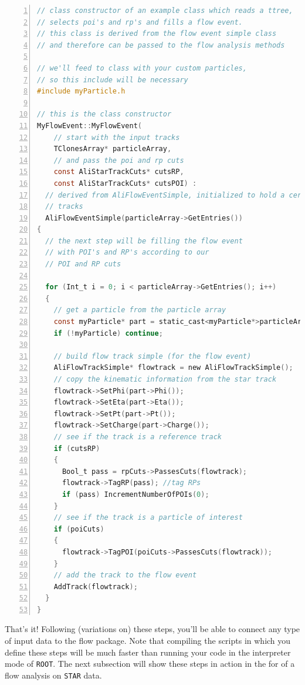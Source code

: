 \documentclass[a4paper]{book}
\numberwithin{equation}{subsection}
\begin{document}
\begin{lstlisting}[language=C, numbers=left]
// class constructor of an example class which reads a ttree, 
// selects poi's and rp's and fills a flow event. 
// this class is derived from the flow event simple class
// and therefore can be passed to the flow analysis methods

// we'll feed to class with your custom particles, 
// so this include will be necessary
#include myParticle.h

// this is the class constructor
MyFlowEvent::MyFlowEvent(
    // start with the input tracks
    TClonesArray* particleArray,
    // and pass the poi and rp cuts
    const AliStarTrackCuts* cutsRP,
    const AliStarTrackCuts* cutsPOI) :
  // derived from AliFlowEventSimple, initialized to hold a certain number of 
  // tracks
  AliFlowEventSimple(particleArray->GetEntries())
{
  // the next step will be filling the flow event
  // with POI's and RP's according to our 
  // POI and RP cuts  
  
  for (Int_t i = 0; i < particleArray->GetEntries(); i++)
  {
    // get a particle from the particle array
    const myParticle* part = static_cast<myParticle*>particleArray->At(i);
    if (!myParticle) continue;
    
    // build flow track simple (for the flow event)
    AliFlowTrackSimple* flowtrack = new AliFlowTrackSimple();
    // copy the kinematic information from the star track
    flowtrack->SetPhi(part->Phi());
    flowtrack->SetEta(part->Eta());
    flowtrack->SetPt(part->Pt());
    flowtrack->SetCharge(part->Charge());
    // see if the track is a reference track
    if (cutsRP)
    {
      Bool_t pass = rpCuts->PassesCuts(flowtrack);
      flowtrack->TagRP(pass); //tag RPs
      if (pass) IncrementNumberOfPOIs(0);
    }
    // see if the track is a particle of interest
    if (poiCuts)
    {
      flowtrack->TagPOI(poiCuts->PassesCuts(flowtrack));
    }
    // add the track to the flow event
    AddTrack(flowtrack);
  }
}\end{lstlisting}
That's it! Following (variations on) these steps, you'll be able to connect any type of input data to the flow package. Note that compiling the scripts in which you define these steps will be much faster than running your code in the interpreter mode of \texttt{ROOT}. The next subsection will show these steps in action in the for of a flow analysis on \texttt{STAR} data.
\end{document}
